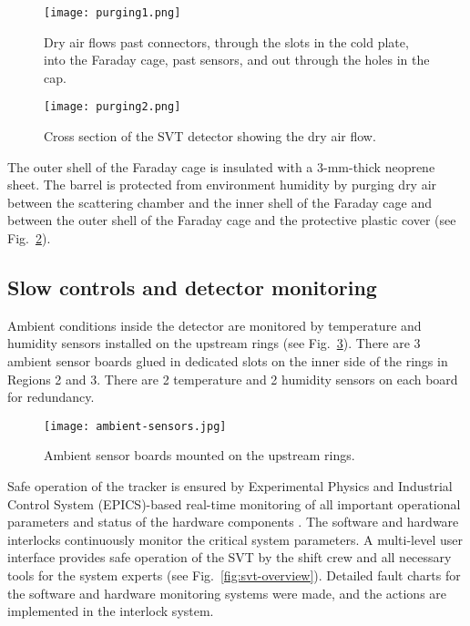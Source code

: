 \begin{figure}[hbt] 
\centering 
\texttt{[image: purging1.png]}
\caption{Dry air flows past connectors, through the slots in the cold plate, into the Faraday cage, past sensors, and out through the holes in the cap.}
\label{fig:purging1}
\end{figure}

\begin{figure}[hbt] 
\centering 
\texttt{[image: purging2.png]}
\caption{Cross section of the SVT detector showing the dry air flow.}
\label{fig:purging2}
\end{figure}

The outer shell of the Faraday cage is insulated with a 3-mm-thick neoprene sheet. The barrel is protected from environment humidity by purging dry air between the scattering chamber and the inner shell of the Faraday cage and between the outer shell of the Faraday cage and the protective plastic cover (see Fig.~\ref{fig:purging2}). 

\subsection{Slow controls and detector monitoring}

Ambient conditions inside the detector are monitored by temperature and humidity sensors installed on the upstream rings (see Fig.~\ref{fig:ambient-sensors}). There are 3 ambient sensor boards glued in dedicated slots on the inner side of the rings in Regions 2 and 3. There are 2 temperature and 2 humidity sensors on each board for redundancy. 

\begin{figure}[hbt] 
\centering 
\texttt{[image: ambient-sensors.jpg]}
\caption{Ambient sensor boards mounted on the upstream rings.}
\label{fig:ambient-sensors}
\end{figure}

Safe operation of the tracker is ensured by Experimental Physics and Industrial Control System (EPICS)-based real-time monitoring of all important operational parameters and status of the hardware components \cite{EPICS}. The software and hardware interlocks continuously monitor the critical system parameters. A multi-level user interface provides safe operation of the SVT by the shift crew and all necessary tools for the system experts (see Fig.~\ref{fig:svt-overview}). Detailed fault charts for the software and hardware monitoring systems were made, and the actions are implemented in the interlock system.

